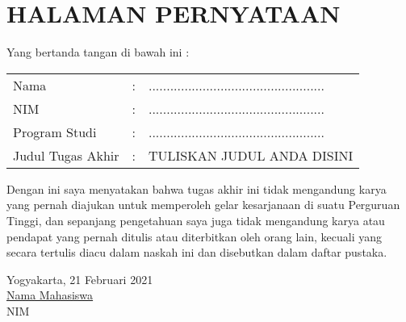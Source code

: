 \chapter*{HALAMAN PERNYATAAN}

\noindent Yang bertanda tangan di bawah ini :

\begin{tabular}{lcl}
	Nama & : & .................................................\\
	NIM & : & .................................................\\
	Program Studi &	: & .................................................\\
	Judul Tugas Akhir &	: & \uppercase{tuliskan judul anda disini}\\
\end{tabular}

\singlespacing
\noindent Dengan ini saya menyatakan bahwa tugas akhir ini tidak mengandung karya yang pernah diajukan untuk memperoleh gelar kesarjanaan di suatu Perguruan Tinggi, dan sepanjang pengetahuan saya juga tidak mengandung karya atau pendapat yang pernah ditulis atau diterbitkan oleh orang lain, kecuali yang secara tertulis diacu dalam naskah ini dan disebutkan dalam daftar pustaka.\\[2cm]

\begin{flushright}
	Yogyakarta, 21 Februari 2021\\[2cm]
	\underline{Nama Mahasiswa}\\
	NIM
\end{flushright}